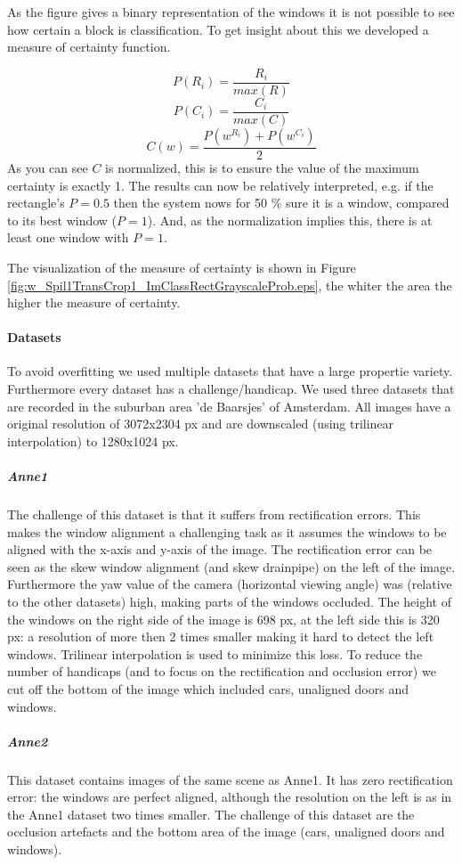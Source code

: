 As the figure gives a binary representation of the windows it is not possible
to see how certain a block is classification.
To get insight about this we developed a measure of certainty function.

\[P(R_i) = \frac{R_i}{max(R)}\]
\[P(C_i) = \frac{C_i}{max(C)}\]
\[C(w) = \frac{P(w^{R_i}) + P(w^{C_i})}{2}\]
As you can see $C$ is normalized, this is to ensure the value of the maximum
certainty is exactly 1. The results can now be relatively interpreted, e.g. if the rectangle's $P=0.5$
then the system nows for 50 \% sure it is a window, compared to its best window ($P=1$). 
And, as the normalization implies this, there is at least one window with $P=1$. 

The visualization of the measure of certainty is shown in Figure
\ref{fig:w_Spil1TransCrop1_ImClassRectGrayscaleProb.eps},  
the whiter the area the higher the measure of certainty.


\paragraph{Datasets}
To avoid overfitting we used multiple datasets that have a large propertie
variety. Furthermore every dataset has a challenge/handicap.
We used three datasets that are recorded in the suburban area
'de Baarsjes' of Amsterdam.  All images have a original resolution of 3072x2304
px and are downscaled (using trilinear interpolation) to 1280x1024 px.

\subparagraph{Anne1}
The challenge of this dataset is that it suffers from rectification errors.
This makes the window alignment a challenging task as it assumes the windows to
be aligned with the x-axis and y-axis of the image.
The rectification error can be seen as the skew window alignment (and skew
drainpipe) on the left of the image. 
Furthermore the yaw value of the camera (horizontal viewing angle) was (relative
to the other datasets) high, making parts of the windows occluded.  The height
of the windows on the right side of the image is 698 px, at the left side this
is 320 px: a resolution of more then 2 times smaller making it hard to detect
the left windows. Trilinear interpolation is used to minimize this loss.
To reduce the number of handicaps (and to focus on the rectification and
occlusion error) we cut off the bottom of the image which included cars, unaligned doors and windows.

\subparagraph{Anne2}
This dataset contains images of the same scene as Anne1.
It has zero rectification error: the windows are perfect aligned, although the
resolution on the left is as in the Anne1 dataset two times smaller.
The challenge of this dataset are the occlusion artefacts and the 
bottom area of the image (cars, unaligned doors and windows).


